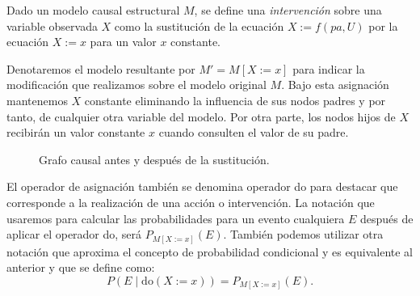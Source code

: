 \documentclass[oneside,openright,titlepage,numbers=noenddot,openany,headinclude,footinclude=true,
cleardoublepage=empty,abstractoff,BCOR=5mm,paper=a4,fontsize=12pt,main=spanish]{scrreprt}
\begin{document}
\begin{definition}[Intervención]
Dado un modelo causal estructural $M$, se define una \textit{intervención} sobre una variable observada $X$ como la sustitución de la ecuación $X:=f(pa,U)$ por la ecuación $X:=x$ para un valor $x$ constante.
\end{definition}

\clearpage

Denotaremos el modelo resultante por $M' = M[X := x]$ para indicar la modificación que realizamos sobre el modelo original $M$. Bajo esta asignación mantenemos $X$ constante eliminando la influencia de sus nodos padres y por tanto, de cualquier otra variable del modelo. Por otra parte, los nodos hijos de $X$ recibirán un valor constante $x$ cuando consulten el valor de su padre.\\

\begin{figure}[h]
\centering
{}
\caption{Grafo causal antes y después de la sustitución.}
\end{figure}

El operador de asignación también se denomina operador do para destacar que corresponde a la realización de una acción o intervención. La notación que usaremos para calcular las probabilidades para un evento cualquiera $E$ después de aplicar el operador do, será $P_{M[X:=x]}(E)$. También podemos utilizar otra notación que aproxima el concepto de probabilidad condicional y es equivalente al anterior y que se define como: 
\begin{equation*}
P(E \mid \text{do}(X:=x))=P_{M[X:=x]}(E).
\end{equation*}
\end{document}
